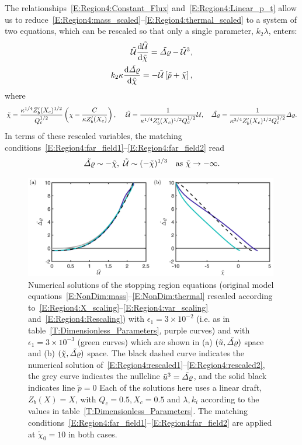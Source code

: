 \documentclass[openacc]{rsproca_new}%
\newcommand{\dd}[2]{\frac{\mathrm{d} #1}{\mathrm{d} #2}}
\newcommand{\epsone}{\epsilon_{1}} %
\begin{document}
The relationships~\eqref{E:Region4:Constant_Flux} and~\eqref{E:Region4:Linear_p_t} allow us to reduce~\eqref{E:Region4:mass_scaled}--\eqref{E:Region4:thermal_scaled} to a system of two equations, which can be rescaled so that only a single parameter, $k_2 \lambda$, enters:
\begin{align}
\tilde{\U} \dd{\tilde{\U}}{\tilde{\chi}} = \tilde{\p} - \tilde{\U}^3,\label{E:Region4:rescaled1}\\
k_2 \lambda \dd{\tilde{\p}}{\tilde{\chi}} = -\tilde{\U}\left[\tilde{p} + \tilde{\chi}\right],\label{E:Region4:rescaled2}
\end{align}
where
\begin{equation}\label{E:Region4:Rescaling}
\tilde{\chi} = \frac{\kappa^{1/4}Z_b'(X_c)^{1/2}}{Q_c^{1/2}}\left(\chi - \frac{C}{\kappa Z_b'(X_c)}\right), ~\quad  \tilde{\mathcal{U}} = \frac{1}{\kappa^{1/4}Z_b'(X_c)^{1/2}Q_c^{1/2}}\mathcal{U},\quad \tilde{\varDelta \varrho}= \frac{1}{\kappa^{3/4}Z_b'(X_c)^{ 1/2}Q_c^{1/2}}\varDelta \varrho.
\end{equation} 
In terms of these rescaled variables, the matching conditions~\eqref{E:Region4:far_field1}--\eqref{E:Region4:far_field2} read
\begin{equation}\label{E:Region4:Rescaled_farfield}
\tilde{\varDelta \varrho} \sim -\tilde{\chi},~ \tilde{\mathcal{U}}\sim (-\tilde{\chi})^{1/3}\quad \text{as}~\tilde{\chi}\to -\infty.
\end{equation}


\begin{figure}
\centering
\includegraphics[width = 0.99\textwidth]{Submitted_PRSA/make_plots/plots/figure5.png}
\caption{Numerical solutions of the stopping region equations (original model equations~\eqref{E:NonDim:mass}--\eqref{E:NonDim:thermal} rescaled according to~\eqref{E:Region4:X_scaling}--\eqref{E:Region4:var_scaling} and~\eqref{E:Region4:Rescaling}) with $\epsone = 3\times 10^{-2}$ (i.e. as in table~\ref{T:Dimensionless_Parameters}, purple curves) and with $\epsone = 3\times 10^{-3}$ (green curves) which are shown in (a) $(\tilde{u}, \tilde{\varDelta \varrho})$ space and (b) $(\tilde{\chi}, \tilde{\varDelta \varrho})$ space. The black dashed curve indicates the numerical solution of~\eqref{E:Region4:rescaled1}--\eqref{E:Region4:rescaled2}, the grey curve indicates the nullcline $\tilde{u}^3 = \tilde{\varDelta \varrho}$, and the solid black indicates line $\tilde{p} = 0$ Each of the solutions here uses a linear draft, $Z_b(X) = X$, with $Q_c = 0.5, X_c = 0.5$ and $\lambda, k_i$ according to the values in table~\ref{T:Dimensionless_Parameters}. The matching conditions~\eqref{E:Region4:far_field1}--\eqref{E:Region4:far_field2} are applied at $\tilde{\chi}_0 = 10$ in both cases. }\label{fig:Region4}
\end{figure}
\end{document}
